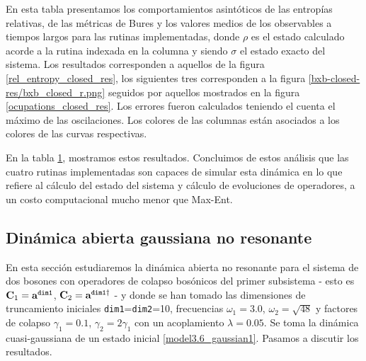 \documentclass{report} %
\numberwithin{equation}{section}
\begin{document}
\begin{table}
\begin{tabular}{llllll}
        \bottomrule
     \end{tabular} 
    \begin{tablenotes}
      \small
      \item En esta tabla presentamos los comportamientos asintóticos de las entropías relativas, de las métricas de Bures y los valores medios de los observables a tiempos largos para las rutinas implementadas, donde $\rho$ es el estado calculado acorde a la rutina indexada en la columna y siendo $\sigma$ el estado exacto del sistema. Los resultados corresponden a aquellos de la figura \ref{rel_entropy_closed_res}, los siguientes tres corresponden a la figura \ref{bxb-closed-res/bxb_closed_r.png} seguidos por aquellos mostrados en la figura \ref{ocupations_closed_res}. Los errores fueron calculados teniendo el cuenta el máximo de las oscilaciones. Los colores de las columnas están asociados a los colores de las curvas respectivas. 
    \end{tablenotes}
    \label{table2}
\end{table}

En la tabla \ref{table2}, mostramos estos resultados. Concluimos de estos análisis que las cuatro rutinas implementadas son capaces de simular esta dinámica en lo que refiere al cálculo del estado del sistema y cálculo de evoluciones de operadores, a un costo computacional mucho menor que Max-Ent. 

\subsection{Dinámica abierta gaussiana no resonante }
\label{bxb_or}

En esta sección estudiaremos la dinámica abierta no resonante para el sistema de dos bosones con operadores de colapso bosónicos del primer subsistema - esto es ${\bf C}_1 = {\bf a}^{\texttt{dim1}}$, ${\bf C}_2 = {\bf a}^{\texttt{dim1}\dagger}$ -  y donde se han tomado las dimensiones de truncamiento iniciales \texttt{dim1}=\texttt{dim2}=10, frecuencias $\omega_1 = 3.0$, $\omega_2 = \sqrt{48}$ y factores de colapso $\gamma_1 = 0.1$, $\gamma_2 = 2 \gamma_1$ con un acoplamiento $\lambda = 0.05$. Se toma la dinámica cuasi-gaussiana de un estado inicial \eqref{model3.6_gaussian1}. Pasamos a discutir los resultados.
\end{document}
